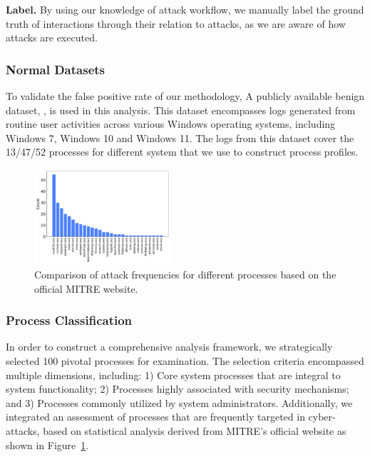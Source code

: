 \noindent
{\bf Label.}
By using our knowledge of attack workflow, we manually label the ground truth of interactions through their relation to attacks, as we are aware of how attacks are executed.


\subsubsection{Normal Datasets}
To validate the false positive rate of our methodology, A publicly available benign dataset, \cite{evtx-baseline2022}, is used in this analysis. This dataset encompasses logs generated from routine user activities across various Windows operating systems, including Windows 7, Windows 10 and Windows 11. The logs from this dataset cover the 13/47/52 processes for different system that we use to construct process profiles.

\begin{figure}[h]
    \centering
      \includegraphics[width=0.45\textwidth]{figs/process.pdf}
    \caption{Comparison of attack frequencies for different processes based on the official MITRE website.}
    \label{fig-process}
\end{figure}

\subsubsection{Process Classification}
In order to construct a comprehensive analysis framework, we strategically selected 100 pivotal processes for examination. The selection criteria encompassed multiple dimensions, including: 1) Core system processes that are integral to system functionality; 2) Processes highly associated with security mechanisms; and 3) Processes commonly utilized by system administrators. Additionally, we integrated an assessment of processes that are frequently targeted in cyber-attacks, based on statistical analysis derived from MITRE's official website as shown in Figure~\ref{fig-process}.

